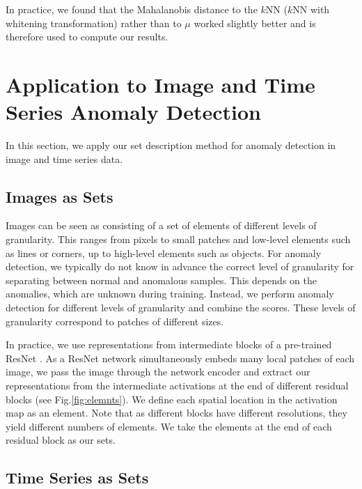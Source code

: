 \documentclass{article}
\begin{document}
In practice, we found that the Mahalanobis distance to the $k$NN ($k$NN with whitening transformation) rather than to $\mu$ worked slightly better and is therefore used to compute our results.







\section{Application to Image and Time Series Anomaly Detection}
\label{sec:applications}


In this section, we apply our set description method for anomaly detection in image and time series data. 

\subsection{Images as Sets}
\label{subsec:images_sets}

Images can be seen as consisting of a set of elements of different levels of granularity. This ranges from pixels to small patches and low-level elements such as lines or corners, up to high-level elements such as objects. For anomaly detection, we typically do not know in advance the correct level of granularity for separating between normal and anomalous samples. This depends on the anomalies, which are unknown during training. Instead, we perform anomaly detection for different levels of granularity and combine the scores. These levels of granularity correspond to patches of different sizes. 

In practice, we use representations from intermediate blocks of a pre-trained ResNet \cite{he2016deep}. As a ResNet network simultaneously embeds many local patches of each image, we pass the image through the network encoder and extract our representations from the intermediate activations at the end of different residual blocks (see Fig.\ref{fig:elemnts}). We define each spatial location in the activation map as an element. Note that as different blocks have different resolutions, they yield different numbers of elements. We take the elements at the end of each residual block as our sets. 



\subsection{Time Series as Sets}
\label{subsec:timeseries_sets}
\end{document}
